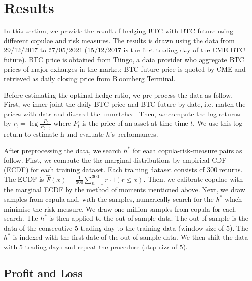 \section{Results}\label{sec:results}
In this section, we provide the result of hedging BTC with BTC future using different copulae and risk measures.
The results is drawn using the data from 29/12/2017 to 27/05/2021 (15/12/2017 is the first trading day of the CME BTC future).
BTC price is obtained from Tiingo, a data provider who aggregate BTC prices of major exhanges in the market;
BTC future price is quoted by CME and retrieved as daily closing price from Bloomberg Terminal.
\medskip

Before estimating the optimal hedge ratio, we pre-process the data as follow.
First, we inner joint the daily BTC price and BTC future by date,
i.e. match the prices with date and discard the unmatched.
Then, we compute the log returns by $r_t = \log \frac{P_t}{P_{t-1}}$ where $P_t$ is the price of an asset at time time $t$.
We use this log return to estimate h and evaluate $h$’s performances. \medskip

After preprocessing the data, we search $h^*$ for each copula-risk-measure pairs as follow.
First, we compute the the marginal distributions by empirical CDF (ECDF) for each training dataset.
Each training dataset consists of 300 returns.
The ECDF is $\hat F(x) = \frac{1}{300}\sum_{n=1}^{300} r \cdot 1(r \leq x)$.
Then, we calibrate copulae with the marginal ECDF by the method of moments mentioned above.
Next, we draw samples from copula and, with the samples, numerically search for the $h^*$ which minimise the risk measure.
We draw one million samples from copula for each search.
The $h^*$ is then applied to the out-of-sample data.
The out-of-sample is the data of the consecutive 5 trading day to the training data (window size of $5$).
The $h^*$ is indexed with the first date of the out-of-sample data.
We then shift the data with $5$ trading days and repeat the procedure (step size of $5$). \medskip

\subsection{Profit and Loss}\label{subsec:empirical-results}


